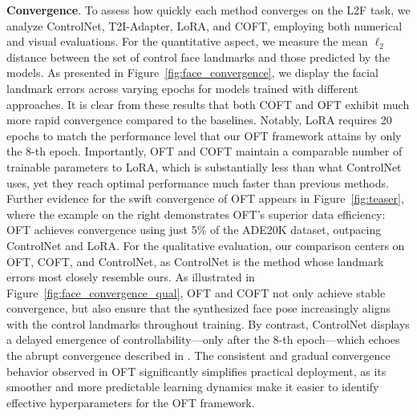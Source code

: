 {\textbf{Convergence}. To assess how quickly each method converges on the L2F task, we analyze ControlNet, T2I-Adapter, LoRA, and COFT, employing both numerical and visual evaluations. For the quantitative aspect, we measure the mean $\ell_2$ distance between the set of control face landmarks and those predicted by the models. As presented in Figure~\ref{fig:face_convergence}, we display the facial landmark errors across varying epochs for models trained with different approaches. It is clear from these results that both COFT and OFT exhibit much more rapid convergence compared to the baselines. Notably, LoRA requires 20 epochs to match the performance level that our OFT framework attains by only the 8-th epoch. Importantly, OFT and COFT maintain a comparable number of trainable parameters to LoRA, which is substantially less than what ControlNet uses, yet they reach optimal performance much faster than previous methods. Further evidence for the swift convergence of OFT appears in Figure~\ref{fig:teaser}, where the example on the right demonstrates OFT's superior data efficiency: OFT achieves convergence using just 5\% of the ADE20K dataset, outpacing ControlNet and LoRA. For the qualitative evaluation, our comparison centers on OFT, COFT, and ControlNet, as ControlNet is the method whose landmark errors most closely resemble ours. As illustrated in Figure~\ref{fig:face_convergence_qual}, OFT and COFT not only achieve stable convergence, but also ensure that the synthesized face pose increasingly aligns with the control landmarks throughout training. By contrast, ControlNet displays a delayed emergence of controllability—only after the 8-th epoch—which echoes the abrupt convergence described in \cite{zhang2023adding}. The consistent and gradual convergence behavior observed in OFT significantly simplifies practical deployment, as its smoother and more predictable learning dynamics make it easier to identify effective hyperparameters for the OFT framework.

}
